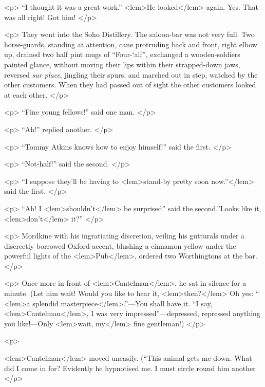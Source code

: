 {{				<p>
				“I thought it was a great work.” 
<lem>He looked</lem>
					{} 
				again. Yes. That was all right! Got him! 
 				</p> 

				<p>
				They went into the Soho Distillery. The saloon-bar was not very full. Two horse-guards, 
				standing at attention, cane protruding back and front, right elbow up, 
				drained two half pint mugs of “Four-`alf”, exchanged a wooden-soldiers painted 
				glance, without moving their lips within their strapped-down jaws, reversed 
				\emph{sur place}, jingling their spurs, and marched out in step, watched by the other 
				customers. When they had passed out of sight the other customers looked at each 
				other. 
 				</p> 

				<p>
				“Fine young fellows!” said one man. 
 				</p> 

				<p>
				“Ah!” replied another. 
 				</p> 

				<p>
				“Tommy Atkins knows how to enjoy himself!” said the first. 
 				</p> 

				<p>
				“Not-half!” said the second. 
 				</p> 

				<p>
				“I suppose they'll be having to 
<lem>stand-by pretty soon now.”</lem>
					{}
				said the first. 
 				</p> 

				<p>
				“Ah! I 
<lem>shouldn't</lem>{} be surprised” said the second.”Looks like it, 
<lem>don't</lem>{} it?” 
 				</p> 

				<p>
				Mordkine with his ingratiating discretion, veiling his gutturals under a discreetly 
				borrowed Oxford-accent, blushing a cinnamon yellow under the powerful lights of 
				the 
<lem>Pub</lem>{}, ordered two Worthingtons at the bar. 
 				</p> 

				<p>
				Once more in front of 
<lem>Cantelman</lem>{}, 
				he sat in silence for a minute. (Let him wait! 
				Would you like to hear it, 
<lem>then?</lem>
					{} 
				Oh yes: “
<lem>a splendid masterpiece</lem>{}.”---You shall 
				have it. “I say, 
<lem>Cantelman</lem>{}, I was very impressed”---depressed, repressed 
				anything you like!---Only 
<lem>wait, my</lem>
					{} 
				fine gentleman!) 
 				</p> 

				<p>
				
<lem>Cantelman</lem>
					{} 
				moved uneasily. (“This animal gets me down. What did I come in for? 
				Evidently he hypnotised me. I must circle round him another 
					{} 
				</p> 

}}
